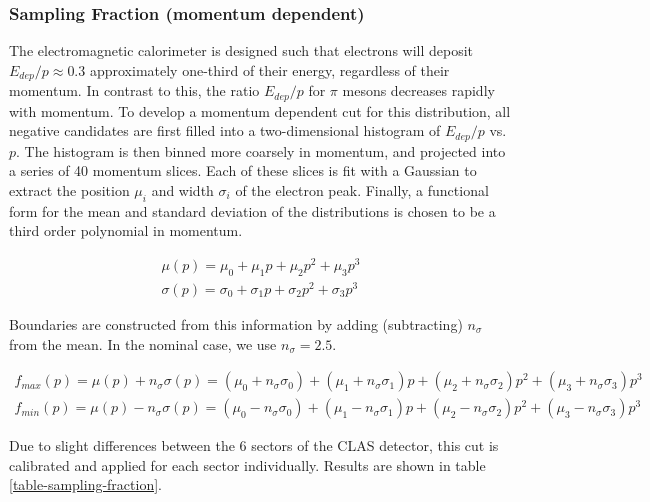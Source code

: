 \subsubsection*{Sampling Fraction (momentum dependent)}
The electromagnetic calorimeter is designed such that electrons will deposit $E_{dep}/p \approx 0.3$ approximately one-third of their energy, regardless of their momentum.  In contrast to this, the ratio $E_{dep}/p$ for $\pi$ mesons decreases rapidly with momentum.  To develop a momentum dependent cut for this distribution, all negative candidates are first filled into a two-dimensional histogram of $E_{dep}/p$ vs. $p$.  The histogram is then binned more coarsely in momentum, and projected into a series of 40 momentum slices.  Each of these slices is fit with a Gaussian to extract the position $\mu_i$ and width $\sigma_i$ of the electron peak.  Finally, a functional form for the mean and standard deviation of the distributions is chosen to be a third order polynomial in momentum.

\begin{eqnarray}
  \mu (p) = \mu_0 + \mu_1 p + \mu_2 p^2 + \mu_3 p^3 \\
  \sigma (p) = \sigma_0 + \sigma_1 p + \sigma_2 p^2 + \sigma_3 p^3 
\end{eqnarray}    

Boundaries are constructed from this information by adding (subtracting) $n_{\sigma}$ from the mean.  In the nominal case, we use $n_{\sigma} = 2.5$.

\begin{eqnarray}
  f_{max} (p) = \mu (p) + n_{\sigma} \sigma (p) = (\mu_0 + n_{\sigma} \sigma_0) + (\mu_1 + n_{\sigma} \sigma_1)p + (\mu_2 + n_{\sigma} \sigma_2)p^2 + (\mu_3 + n_{\sigma} \sigma_3)p^3 \\
  f_{min} (p) = \mu (p) - n_{\sigma} \sigma (p) = (\mu_0 - n_{\sigma} \sigma_0) + (\mu_1 - n_{\sigma} \sigma_1)p + (\mu_2 - n_{\sigma} \sigma_2)p^2 + (\mu_3 - n_{\sigma} \sigma_3)p^3
\end{eqnarray}

Due to slight differences between the 6 sectors of the CLAS detector, this cut is calibrated and applied for each sector individually.  Results are shown in table \ref{table-sampling-fraction}.



